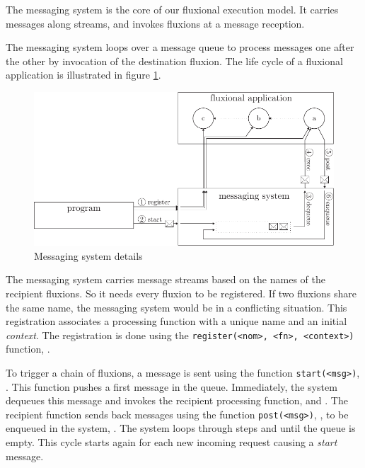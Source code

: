 The messaging system is the core of our fluxional execution model.
It carries messages along streams, and invokes fluxions at a message reception.

The messaging system loops over a message queue to process messages one after the other by invocation of the destination fluxion.
The life cycle of a fluxional application is illustrated in figure \ref{fig:MesSys}.

\begin{figure}[h!]
  \includegraphics[width=\linewidth]{ressources/schema-message.pdf}
  \caption{Messaging system details}
  \label{fig:MesSys}
\end{figure}

The messaging system carries message streams based on the names of the recipient fluxions.
So it needs every fluxion to be registered.
If two fluxions share the same name, the messaging system would be in a conflicting situation.
This registration associates a processing function with a unique name and an initial \textit{context}.
The registration is done using the \texttt{register(<nom>, <fn>, <context>)} function, .

To trigger a chain of fluxions, a message is sent using the function \texttt{start(<msg>)}, .
This function pushes a first message in the queue.
Immediately, the system dequeues this message and invokes the recipient processing function,  and .
The recipient function sends back messages using the function \texttt{post(<msg>)}, , to be enqueued in the system, .
The system loops through steps  and  until the queue is empty.
This cycle starts again for each new incoming request causing a \textit{start} message.

